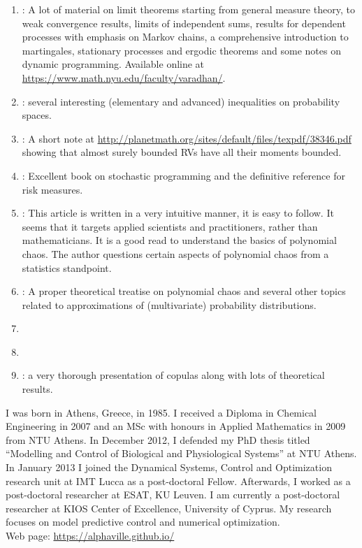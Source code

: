 \documentclass[a4paper,10pt]{scrbook}
\let\oldbibentry\bibentry
\renewcommand{\bibentry}[1]{{\color{blue} \oldbibentry{#1}}}
\begin{document}
{\begin{enumerate}
 \item \label{cite:Varadhan} : A lot of material on limit theorems 
       starting from general measure theory, to weak convergence results, limits 
       of independent sums, results for dependent processes 
       with emphasis on Markov chains, a comprehensive introduction to martingales, stationary processes
       and ergodic theorems and some notes on dynamic programming. 
       Available online at \url{https://www.math.nyu.edu/faculty/varadhan/}.
 \item \label{cite:LinBai2011} : several interesting (elementary 
       and advanced) inequalities on probability spaces.  
 \item \label{cite:Ambrosio2013} : A short note at
       \url{http://planetmath.org/sites/default/files/texpdf/38346.pdf}
       showing that almost surely bounded RVs have all their moments bounded.
 \item \label{cite:SDR2014} : Excellent book on stochastic programming and 
       the definitive reference for risk measures.
 \item \label{cite:AOHaganPolyChaos13} : This article is written 
       in a very intuitive manner, it is easy to follow. It seems that it targets applied scientists
       and practitioners, rather than mathematicians. It is a good read to understand the basics of 
       polynomial chaos. The author questions certain aspects of polynomial chaos from 
       a statistics standpoint.
 \item \label{cite:DXiu10} : A proper theoretical treatise on polynomial chaos
       and several other topics related to approximations of (multivariate) probability distributions.
 \item \label{cite:Eldred2009}   
 \item \label{cite:CopingWithCopulas} 
 \item \label{cite:copulasSlides} : a very thorough presentation of 
       copulas along with lots of theoretical results. 
\end{enumerate}
}

I was born in Athens, Greece, in 1985. I received a Diploma in Chemical Engineering in 2007 and an 
MSc with honours in Applied Mathematics in 2009 from NTU Athens. In December 2012, I defended my 
PhD thesis titled ``Modelling and Control of Biological and Physiological Systems'' at NTU Athens. 
In January 2013 I joined the Dynamical Systems, Control and Optimization research unit at IMT 
Lucca as a post-doctoral Fellow. Afterwards, I worked as a post-doctoral researcher at ESAT, KU Leuven. 
I am currently a post-doctoral researcher at KIOS Center of Excellence, University of Cyprus. 
My research focuses on model predictive control and numerical optimization.\\[1.2em]

\noindent Web page: \url{https://alphaville.github.io/}

\end{document}

